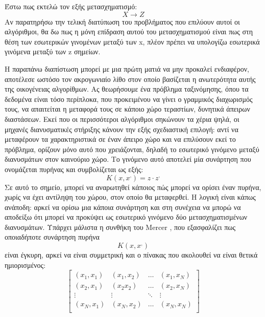 		Έστω πως εκτελώ τον εξής μετασχηματισμό:
	   \begin{equation}
	   		X \rightarrow Z
	   \end{equation}
		Αν παρατηρήσω την τελική διατύπωση του προβλήματος που επιλύουν αυτοί οι αλγόριθμοι, θα δω πως η μόνη επίδραση αυτού του μετασχηματισμού είναι πως στη θέση των εσωτερικών γινομένων μεταξύ των x, πλέον πρέπει να υπολογίζω εσωτερικά γινόμενα μεταξύ των z σημείων.
		
		Η παραπάνω διαπίστωση μπορεί με μια πρώτη ματιά να μην προκαλεί ενδιαφέρον, αποτέλεσε ωστόσο τον ακρογωνιαίο λίθο στον οποίο βασίζεται η ανωτερότητα αυτής της οικογένειας αλγορίθμων. Ας θεωρήσουμε ένα πρόβλημα ταξινόμησης, όπου τα δεδομένα είναι τόσο περίπλοκα, που προκειμένου να γίνει ο γραμμικός διαχωρισμός τους, να απαιτείται η μεταφορά τους σε κάποιο χώρο τεραστίων, δυνητικά άπειρων διαστάσεων. Εκεί που οι περισσότεροι αλγόριθμοι σηκώνουν τα χέρια ψηλά, οι μηχανές διανυσματικές στήριξης κάνουν την εξής σχεδιαστική επιλογή: αντί να μεταφέρουν τα χαρακτηριστικά σε έναν άπειρο χώρο και να επιλύσουν εκεί το πρόβλημα, ορίζουν μόνο αυτό που χρειάζονται, δηλαδή το εσωτερικό γινόμενο μεταξύ διανυσμάτων στον καινούριο χώρο. Το γινόμενο αυτό αποτελεί μία συνάρτηση που ονομάζεται πυρήνας και συμβολίζεται ως εξής: 
		\begin{equation}
		K(x, x^,)= z \cdot z^,
		\end{equation}
		Σε αυτό το σημείο, μπορεί να αναρωτηθεί κάποιος πώς μπορεί να ορίσει έναν πυρήνα, χωρίς να έχει αντίληψη του χώρου, στον οποίο θα μεταφερθεί. Η λογική είναι κάπως ανάποδη: αρκεί να ορίσω μια κάποια συνάρτηση και στη συνέχεια να μπορώ να αποδείξω ότι μπορεί να προκύψει ως εσωτερικό γινόμενο δύο μετασχηματισμένων διανυσμάτων. Υπάρχει μάλιστα η συνθήκη του Mercer \citet{Mercer415}, που εξασφαλίζει πως οποιαδήποτε συνάρτηση πυρήνα
		\begin{equation}
		K(x, x^,)
		\end{equation}
		είναι έγκυρη, αρκεί να είναι συμμετρική και ο πίνακας που ακολουθεί να είναι θετικά ημιορισμένος:
		\begin{equation}
		\begin{bmatrix}
		(x_1, x_1) &  (x_1, x_2)  & \dots  &   (x_1, x_N) \\
		(x_2, x_1) &  (x_2 x_2)  & \dots  &   (x_2, x_N) \\
		\vdots  & \vdots &\ddots & \vdots \\
		(x_N, x_1) &  (x_N, x_2)  & \dots  &   (x_N, x_N) \\
		\end{bmatrix}
		\end{equation}

